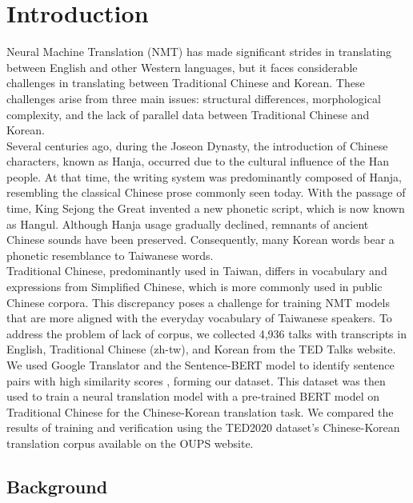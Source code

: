 \documentclass[PhD]{PHlab-thesis}
\begin{document}
\chapter{Introduction}
Neural Machine Translation (NMT) has made significant strides in translating between English and other Western languages, but it faces considerable challenges in translating between Traditional Chinese and Korean. These challenges arise from three main issues: structural differences, morphological complexity, and the lack of parallel data between Traditional Chinese and Korean. \\
Several centuries ago, during the Joseon Dynasty, the introduction of Chinese characters, known as Hanja, occurred due to the cultural influence of the Han people. At that time, the writing system was predominantly composed of Hanja, resembling the classical Chinese prose commonly seen today. With the passage of time, King Sejong the Great invented a new phonetic script, which is now known as Hangul. Although Hanja usage gradually declined, remnants of ancient Chinese sounds have been preserved. Consequently, many Korean words bear a phonetic resemblance to Taiwanese words.\\
Traditional Chinese, predominantly used in Taiwan, differs in vocabulary and expressions from Simplified Chinese, which is more commonly used in public Chinese corpora. This discrepancy poses a challenge for training NMT models that are more aligned with the everyday vocabulary of Taiwanese speakers.
To address the problem of lack of corpus, we collected 4,936 talks with transcripts in English, Traditional Chinese (zh-tw), and Korean from the TED Talks website\cite{tedTalks}. We used Google Translator\cite{googletrans} and the Sentence-BERT\cite{reimers2019sentence} model to identify sentence pairs with high similarity scores , forming our dataset. This dataset was then used to train a neural translation model with a pre-trained BERT model on Traditional Chinese for the Chinese-Korean translation task.\cite{ckip-bert} We compared the results of training and verification using the TED2020 dataset's Chinese-Korean translation corpus available on the OUPS website.\cite{reimers-2020-multilingual-sentence-bert}

\section{Background} 

\end{document}
